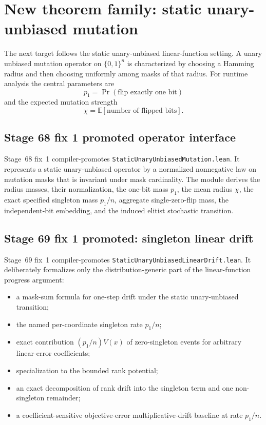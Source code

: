 \documentclass[11pt]{article}
\begin{document}
\section{New theorem family: static unary-unbiased mutation}

The next target follows the static unary-unbiased linear-function setting. A unary
unbiased mutation operator on $\{0,1\}^n$ is characterized by choosing a Hamming radius
and then choosing uniformly among masks of that radius. For runtime analysis the central
parameters are
\[
  p_1=\Pr(\text{flip exactly one bit})
\]
and the expected mutation strength
\[
  \chi=\mathbb E[\text{number of flipped bits}].
\]

\subsection{Stage 68 fix 1 promoted operator interface}

Stage~68 fix~1 compiler-promotes \texttt{StaticUnaryUnbiasedMutation.lean}. It represents
a static unary-unbiased operator by a normalized nonnegative law on mutation masks that
is invariant under mask cardinality. The module derives the radius masses, their
normalization, the one-bit mass $p_1$, the mean radius $\chi$, the exact specified
singleton mass $p_1/n$, aggregate single-zero-flip mass, the independent-bit embedding,
and the induced elitist stochastic transition.

\subsection{Stage 69 fix 1 promoted: singleton linear drift}

Stage~69 fix~1 compiler-promotes \texttt{StaticUnaryUnbiasedLinearDrift.lean}. It deliberately formalizes
only the distribution-generic part of the linear-function progress argument:
\begin{itemize}[nosep]
  \item a mask-sum formula for one-step drift under the static unary-unbiased transition;
  \item the named per-coordinate singleton rate $p_1/n$;
  \item exact contribution $(p_1/n)V(x)$ of zero-singleton events for arbitrary
        linear-error coefficients;
  \item specialization to the bounded rank potential;
  \item an exact decomposition of rank drift into the singleton term and one
        non-singleton remainder;
  \item a coefficient-sensitive objective-error multiplicative-drift baseline at rate
        $p_1/n$.
\end{itemize}
\end{document}

